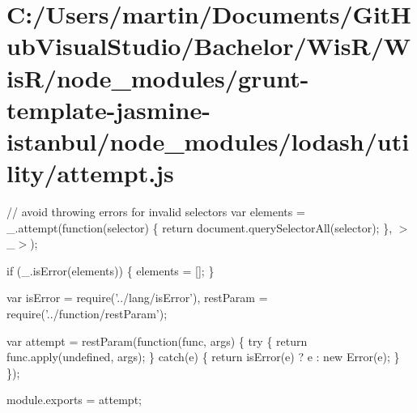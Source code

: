 \hypertarget{_c_1_2_users_2martin_2_documents_2_git_hub_visual_studio_2_bachelor_2_wis_r_2_wis_r_2node_module12c6eb4a9b249d319b37fcdecafb8c1a}{}\section{C\+:/\+Users/martin/\+Documents/\+Git\+Hub\+Visual\+Studio/\+Bachelor/\+Wis\+R/\+Wis\+R/node\+\_\+modules/grunt-\/template-\/jasmine-\/istanbul/node\+\_\+modules/lodash/utility/attempt.\+js}
// avoid throwing errors for invalid selectors var elements = \+\_\+.\+attempt(function(selector) \{ return document.\+query\+Selector\+All(selector); \}, \textquotesingle{}$>$\+\_\+$>$\textquotesingle{});

if (\+\_\+.\+is\+Error(elements)) \{ elements = \mbox{[}\mbox{]}; \}


\begin{DoxyCodeInclude}
var isError = require(\textcolor{stringliteral}{'../lang/isError'}),
    restParam = require(\textcolor{stringliteral}{'../function/restParam'});

var attempt = restParam(\textcolor{keyword}{function}(func, args) \{
  \textcolor{keywordflow}{try} \{
    \textcolor{keywordflow}{return} func.apply(undefined, args);
  \} \textcolor{keywordflow}{catch}(e) \{
    \textcolor{keywordflow}{return} isError(e) ? e : \textcolor{keyword}{new} Error(e);
  \}
\});

module.exports = attempt;
\end{DoxyCodeInclude}
 